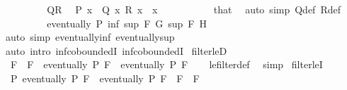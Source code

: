 \begin{isabellebody}
\ \ \ \ \ \ \isamarkupfalse%
\ \isamarkupfalse%
\ QR\ \isamarkupfalse%
\ {\isachardoublequoteopen}P\ x{\isachardoublequoteclose}\ \ {\isachardoublequoteopen}Q{\isacharprime}{\kern0pt}\ x{\isachardoublequoteclose}\ {\isachardoublequoteopen}R{\isacharprime}{\kern0pt}\ x{\isachardoublequoteclose}\ \ x\ \isanewline
\ \ \ \ \ \ \ \ \isamarkupfalse%
\ that\ \isamarkupfalse%
\ {\isacharparenleft}{\kern0pt}auto\ simp{\isacharcolon}{\kern0pt}\ Q{\isacharprime}{\kern0pt}{\isacharunderscore}{\kern0pt}def\ R{\isacharprime}{\kern0pt}{\isacharunderscore}{\kern0pt}def{\isacharparenright}{\kern0pt}\isanewline
\ \ \ \ \ \ \isamarkupfalse%
\ \isamarkupfalse%
\ {\isachardoublequoteopen}eventually\ P\ {\isacharparenleft}{\kern0pt}inf\ {\isacharparenleft}{\kern0pt}sup\ F\ G{\isacharparenright}{\kern0pt}\ {\isacharparenleft}{\kern0pt}sup\ F\ H{\isacharparenright}{\kern0pt}{\isacharparenright}{\kern0pt}{\isachardoublequoteclose}\isanewline
\ \ \ \ \ \ \ \ \isamarkupfalse%
\ {\isacharparenleft}{\kern0pt}auto\ simp{\isacharcolon}{\kern0pt}\ eventually{\isacharunderscore}{\kern0pt}inf\ eventually{\isacharunderscore}{\kern0pt}sup{\isacharparenright}{\kern0pt}\isanewline
\ \ \ \ \isamarkupfalse%
\isanewline
\ \ \isamarkupfalse%
\ {\isacharparenleft}{\kern0pt}auto\ intro{\isacharcolon}{\kern0pt}\ inf{\isachardot}{\kern0pt}coboundedI{}\ inf{\isachardot}{\kern0pt}coboundedI{}{\isacharparenright}{\kern0pt}\isanewline
{}\isamarkupfalse%
%
\endisatagproof
{\isafoldproof}%
%
\isadelimproof
\isanewline
%
\endisadelimproof
\isanewline
\isanewline
{}\isamarkupfalse%
\ filter{\isacharunderscore}{\kern0pt}leD{\isacharcolon}{\kern0pt}\isanewline
\ \ {\isachardoublequoteopen}F\ {\isasymle}\ F{\isacharprime}{\kern0pt}\ {\isasymLongrightarrow}\ eventually\ P\ F{\isacharprime}{\kern0pt}\ {\isasymLongrightarrow}\ eventually\ P\ F{\isachardoublequoteclose}\isanewline
%
\isadelimproof
\ \ %
\endisadelimproof
%
\isatagproof
{}\isamarkupfalse%
\ le{\isacharunderscore}{\kern0pt}filter{\isacharunderscore}{\kern0pt}def\ \isamarkupfalse%
\ simp%
\endisatagproof
{\isafoldproof}%
%
\isadelimproof
\isanewline
%
\endisadelimproof
\isanewline
{}\isamarkupfalse%
\ filter{\isacharunderscore}{\kern0pt}leI{\isacharcolon}{\kern0pt}\isanewline
\ \ {\isachardoublequoteopen}{\isacharparenleft}{\kern0pt}{\isasymAnd}P{\isachardot}{\kern0pt}\ eventually\ P\ F{\isacharprime}{\kern0pt}\ {\isasymLongrightarrow}\ eventually\ P\ F{\isacharparenright}{\kern0pt}\ {\isasymLongrightarrow}\ F\ {\isasymle}\ F{\isacharprime}{\kern0pt}{\isachardoublequoteclose}\isanewline

\end{isabellebody}
